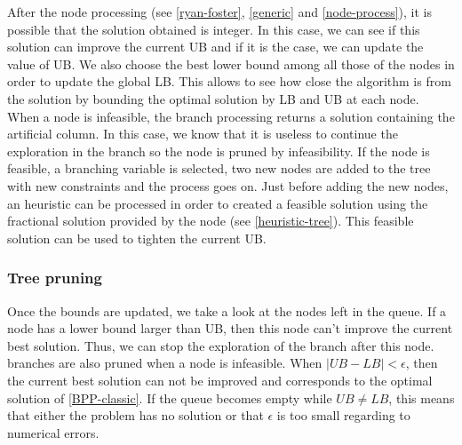 After the node processing (see \ref{ryan-foster}, \ref{generic} and \ref{node-process}), it is possible that the solution obtained is integer. In this case, we can see if this solution can improve the current UB and if it is the case, we can update the value of UB. We also choose the best lower bound among all those of the nodes in order to update the global LB. This allows to see how close the algorithm is from the solution by bounding the optimal solution by LB and UB at each node. When a node is infeasible, the branch processing returns a solution containing the artificial column. In this case, we know that it is useless to continue the exploration in the branch so the node is pruned by infeasibility. If the node is feasible, a branching variable is selected, two new nodes are added to the tree with new constraints and the process goes on. Just before adding the new nodes, an heuristic can be processed in order to created a feasible solution using the fractional solution provided by the node (see \ref{heuristic-tree}). This feasible solution can be used to tighten the current UB.

\subsubsection{Tree pruning}

Once the bounds are updated, we take a look at the nodes left in the queue. If a node has a lower bound larger than UB, then this node can't improve the current best solution. Thus, we can stop the exploration of the branch after this node. branches are also pruned when a node is infeasible. When $|UB - LB| < \epsilon$, then the current best solution can not be improved and corresponds to the optimal solution of \eqref{BPP-classic}. If the queue becomes empty while $UB \neq LB$, this means that either the problem has no solution or that $\epsilon$ is too small regarding to numerical errors.
